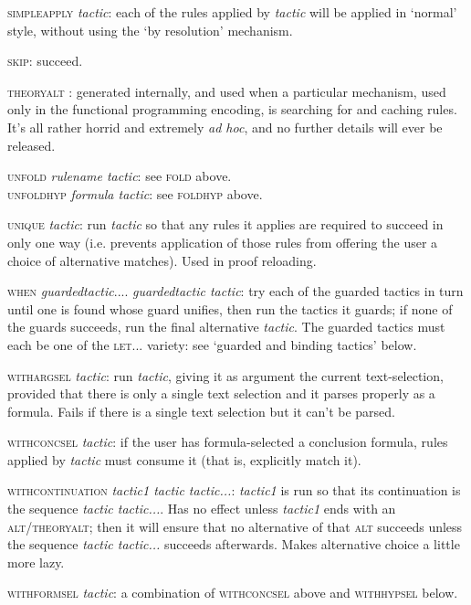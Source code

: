 \documentclass[11pt]{book}
\begin{document}
\textsc{simpleapply} \textit{tactic}: each of the rules applied by \textit{tactic} will be applied in `normal' style, without using the `by resolution' mechanism.


\textsc{skip}: succeed.


\textsc{theoryalt} : generated internally, and used when a particular mechanism, used only in the functional programming encoding, is searching for and caching rules. It's all rather horrid and extremely \textit{ad hoc}, and no further details will ever be released.


\textsc{unfold} \textit{rulename tactic}: see \textsc{fold} above.\\
\textsc{unfoldhyp} \textit{formula tactic}: see \textsc{foldhyp} above.


\textsc{unique} \textit{tactic}: run \textit{tactic} so that any rules it applies are required to succeed in only one way (i.e. prevents application of those rules from offering the user a choice of alternative matches). Used in proof reloading.


\textsc{when} \textit{guardedtactic}.... \textit{guardedtactic tactic}: try each of the guarded tactics in turn until one is found whose guard unifies, then run the tactics it guards; if none of the guards succeeds, run the final alternative \textit{tactic}. The guarded tactics must each be one of the \textsc{let...} variety: see `guarded and binding tactics' below.


\textsc{withargsel} \textit{tactic}: run \textit{tactic}, giving it as argument the current text-selection, provided that there is only a single text selection and it parses properly as a formula. Fails if there is a single text selection but it can't be parsed.


\textsc{withconcsel} \textit{tactic}: if the user has formula-selected a conclusion formula, rules applied by \textit{tactic} must consume it (that is, explicitly match it).


\textsc{withcontinuation} \textit{tactic1 tactic tactic...}: \textit{tactic1} is run so that its continuation is the sequence \textit{tactic tactic...}. Has no effect unless \textit{tactic1} ends with an \textsc{alt/theoryalt}; then it will ensure that no alternative of that \textsc{alt} succeeds unless the sequence \textit{tactic tactic...} succeeds afterwards. Makes alternative choice a little more lazy.


\textsc{withformsel} \textit{tactic}: a combination of \textsc{withconcsel} above and \textsc{withhypsel} below.
\end{document}
